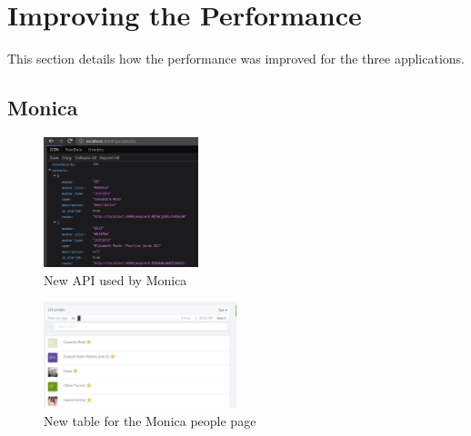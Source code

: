 \documentclass[sigconf]{acmart}
\begin{document}
\section{Improving the Performance}
This section details how the performance was improved for the three applications.
\subsection{Monica}
\begin{figure}[t!]
\includegraphics[width=0.4\textwidth]{apimonica}
\caption{New API used by Monica}
\label{apimonica}
\end{figure}
\begin{figure}[t!]
\includegraphics[width=0.5\textwidth]{tablemonica}
\caption{New table for the Monica people page}
\label{tablemonica}
\end{figure}
\end{document}
